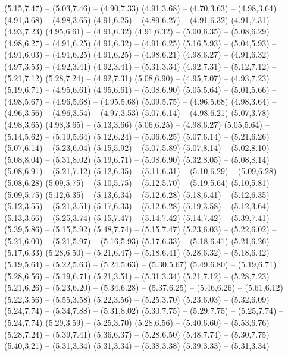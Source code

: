 {  (5.15,7.47) -- (5.03,7.46) -- (4.90,7.33)
  (4.91,3.68) -- (4.70,3.63) -- (4.98,3.64)
  (4.91,3.68) -- (4.98,3.65)
  (4.91,6.25) -- (4.89,6.27) -- (4.91,6.32)
  (4.91,7.31) -- (4.93,7.23)
  (4.95,6.61) -- (4.91,6.32)
  (4.91,6.32) -- (5.00,6.35) -- (5.08,6.29)
  (4.98,6.27) -- (4.91,6.25)
  (4.91,6.32) -- (4.91,6.25)
  (5.16,5.93) -- (5.04,5.93) -- (4.91,6.03) -- (4.91,6.25)
  (4.91,6.25) -- (4.98,6.21)
  (4.98,6.27) -- (4.91,6.32)
  (4.97,3.53) -- (4.92,3.41)
  (4.92,3.41) -- (5.31,3.34)
  (4.92,7.31) -- (5.12,7.12) -- (5.21,7.12)
  (5.28,7.24) -- (4.92,7.31)
  (5.08,6.90) -- (4.95,7.07) -- (4.93,7.23)
  (5.19,6.71) -- (4.95,6.61)
  (4.95,6.61) -- (5.08,6.90)
  (5.05,5.64) -- (5.01,5.66) -- (4.98,5.67) -- (4.96,5.68) -- (4.95,5.68)
  (5.09,5.75) -- (4.96,5.68)
  (4.98,3.64) -- (4.96,3.56) -- (4.96,3.54) -- (4.97,3.53)
  (5.07,6.14) -- (4.98,6.21)
  (5.07,3.78) -- (4.98,3.65)
  (4.98,3.65) -- (5.13,3.66)
  (5.06,6.25) -- (4.98,6.27)
  (5.05,5.64) -- (5.14,5.62) -- (5.19,5.64)
  (5.12,6.24) -- (5.06,6.25)
  (5.07,6.14) -- (5.21,6.26)
  (5.07,6.14) -- (5.23,6.04)
  (5.15,5.92) -- (5.07,5.89)
  (5.07,8.14) -- (5.02,8.10) -- (5.08,8.04) -- (5.31,8.02)
  (5.19,6.71) -- (5.08,6.90)
  (5.32,8.05) -- (5.08,8.14)
  (5.08,6.91) -- (5.21,7.12)
  (5.12,6.35) -- (5.11,6.31) -- (5.10,6.29) -- (5.09,6.28) -- (5.08,6.28)
  (5.09,5.75) -- (5.10,5.75) -- (5.12,5.70) -- (5.19,5.64)
  (5.10,5.81) -- (5.09,5.75)
  (5.12,6.35) -- (5.13,6.34) -- (5.12,6.28)
  (5.18,6.41) -- (5.12,6.35)
  (5.12,3.55) -- (5.21,3.51)
  (5.17,6.33) -- (5.12,6.28)
  (5.19,3.58) -- (5.12,3.64)
  (5.13,3.66) -- (5.25,3.74)
  (5.15,7.47) -- (5.14,7.42)
  (5.14,7.42) -- (5.39,7.41)
  (5.39,5.86) -- (5.15,5.92)
  (5.48,7.74) -- (5.15,7.47)
  (5.23,6.03) -- (5.22,6.02) -- (5.21,6.00) -- (5.21,5.97) -- (5.16,5.93)
  (5.17,6.33) -- (5.18,6.41)
  (5.21,6.26) -- (5.17,6.33)
  (5.28,6.50) -- (5.21,6.47) -- (5.18,6.41)
  (5.28,6.32) -- (5.18,6.42)
  (5.19,5.64) -- (5.22,5.63) -- (5.24,5.63) -- (5.30,5.67)
  (5.49,6.80) -- (5.19,6.71)
  (5.28,6.56) -- (5.19,6.71)
  (5.21,3.51) -- (5.31,3.34)
  (5.21,7.12) -- (5.28,7.23)
  (5.21,6.26) -- (5.23,6.20) -- (5.34,6.28) -- (5.37,6.25) -- (5.46,6.26) -- (5.61,6.12)
  (5.22,3.56) -- (5.55,3.58)
  (5.22,3.56) -- (5.25,3.70)
  (5.23,6.03) -- (5.32,6.09)
  (5.24,7.74) -- (5.34,7.88) -- (5.31,8.02)
  (5.30,7.75) -- (5.29,7.75) -- (5.25,7.74) -- (5.24,7.74)
  (5.29,3.59) -- (5.25,3.70)
  (5.28,6.56) -- (5.40,6.60) -- (5.53,6.76)
  (5.28,7.24) -- (5.39,7.41)
  (5.36,6.37) -- (5.28,6.50)
  (5.48,7.74) -- (5.30,7.75)
  (5.40,3.21) -- (5.31,3.34)
  (5.31,3.34) -- (5.38,3.38)
  (5.39,3.33) -- (5.31,3.34)
}
